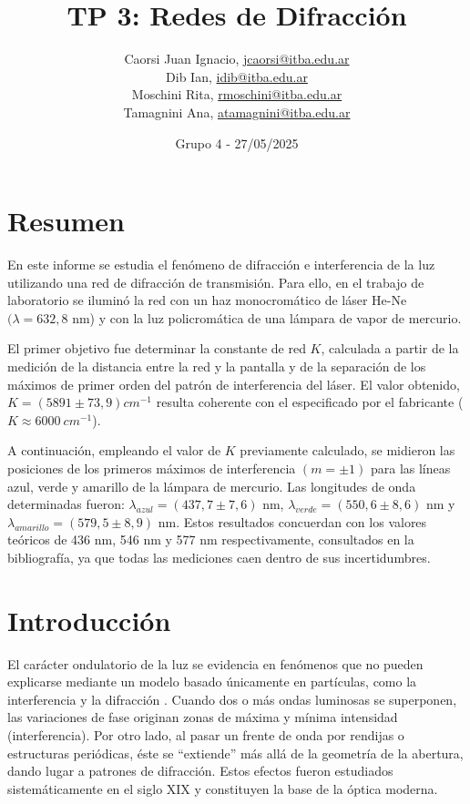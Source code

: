 \documentclass[12pt, a4paper]{article}
\title{TP 3: Redes de Difracción}
\author
{
  Caorsi Juan Ignacio, \href{jcaorsi@itba.edu.ar}{jcaorsi@itba.edu.ar} \\
  Dib Ian, \href{idib@itba.edu.ar}{idib@itba.edu.ar} \\
  Moschini Rita, \href{rmoschini@itba.edu.ar}{rmoschini@itba.edu.ar} \\
  Tamagnini Ana, \href{atamagnini@itba.edu.ar}{atamagnini@itba.edu.ar}
}
\date{Grupo 4 - 27/05/2025}
\begin{document}
\maketitle



\section{Resumen}

En este informe se estudia el fenómeno de difracción e interferencia de la luz utilizando una red de difracción de transmisión. Para ello, 
en el trabajo de laboratorio se iluminó la red con un haz monocromático de láser He-Ne $(\lambda = 632,8$ nm) y con la luz policromática de 
una lámpara de vapor de mercurio.

El primer objetivo fue determinar la constante de red $K$, calculada a partir de la medición de la distancia entre la red y la pantalla y 
de la separación de los máximos de primer orden del patrón de interferencia del láser. El valor obtenido, $K = (5891 \pm 73,9) cm^{-1}$
resulta coherente con el especificado por el fabricante ($K\approx6000\ cm^{-1}$).

A continuación, empleando el valor de $K$ previamente calculado, se midieron las posiciones de los primeros máximos de interferencia 
$(m = \pm 1)$ para las líneas azul, verde y amarillo de la lámpara de mercurio. Las longitudes de onda determinadas fueron:
$\lambda_{azul} = (437,7 \pm 7,6)$ nm, $\lambda_{verde} = (550,6 \pm 8,6)$ nm y $\lambda_{amarillo} = (579,5 \pm 8,9)$ nm. Estos resultados 
concuerdan con los valores teóricos de 436 nm, 546 nm y 577 nm respectivamente, consultados en la bibliografía, ya que todas las 
mediciones caen dentro de sus incertidumbres.


\section{Introducción}

El carácter ondulatorio de la luz se evidencia en fenómenos que no pueden explicarse mediante un modelo basado únicamente en partículas, 
como la interferencia y la difracción \cite{hecht_optics}. Cuando dos o más ondas luminosas se superponen, las variaciones de fase originan zonas de máxima y 
mínima intensidad (interferencia). Por otro lado, al pasar un frente de onda por rendijas o estructuras periódicas, éste se “extiende” más 
allá de la geometría de la abertura, dando lugar a patrones de difracción. Estos efectos fueron estudiados sistemáticamente en el siglo XIX 
y constituyen la base de la óptica moderna.
\end{document}
